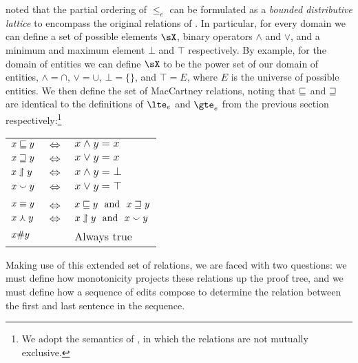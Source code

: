  noted that the partial ordering of
  $\leq_e$ can be formulated as a \textit{bounded distributive
  lattice} to encompass the original relations of
  .
In particular, for every domain we can define a set of possible 
  elements $\sX$, binary operators $\land$ and $\lor$,
  and a minimum and maximum element $\bot$ and $\top$ respectively.
By example, for the domain of entities we can define $\sX$ to be
  the power set of our domain of entities, $\land=\cap$,
  $\lor=\cup$, $\bot=\{\}$, and $\top=E$, where $E$ is the universe
  of possible entities.
We then define the set of MacCartney relations, noting that
  $\sqsubseteq$ and $\sqsupseteq$ are identical to the definitions of
  $\lte_e$ and $\gte_e$ from the previous section respectively:\footnote{
    We adopt the semantics of , 
    in which the relations are not mutually exclusive.
  }

\begin{center}
\begin{tabular}{lcl}
  $x \sqsubseteq y$ & $\Leftrightarrow$ & $x \land y = x$ \\
  $x \sqsupseteq y$ & $\Leftrightarrow$ & $x \lor y = x$ \\
  $x \downharpoonleft\hspace{-0.30em}\upharpoonright y$ & $\Leftrightarrow$ & $x \land y = \bot$ \\
  $x \smallsmile y$ & $\Leftrightarrow$ & $x \lor y = \top$ \\
  \vspace{-0.5em} & & \\
  $x \equiv y$ & $\Leftrightarrow$ & $x \sqsubseteq y~~\textrm{and}~~x \sqsupseteq y$ \\
  $x \curlywedge y$ & $\Leftrightarrow$ & $x \downharpoonleft\hspace{-0.30em}\upharpoonright y~~\textrm{and}~~x \smallsmile y$ \\
  $x \# y$ & & Always true
\end{tabular}
\end{center}

Making use of this extended set of relations, we are faced with two
  questions:
  we must define how monotonicity projects these relations up the
  proof tree,
  and we must define how a sequence of edits compose to determine the
  relation between the first and last sentence in the sequence.

